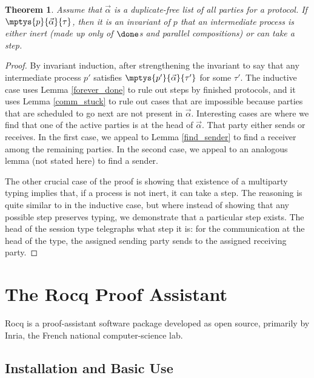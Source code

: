 \documentclass{amsbook}
\newtheorem{theorem}{Theorem}[chapter]
\theoremstyle{definition}
\theoremstyle{remark}
\numberwithin{section}{chapter}
\numberwithin{equation}{chapter}
\begin{document}
\begin{theorem}
  Assume that $\vec{\alpha}$ is a duplicate-free list of \emph{all} parties for a protocol.
  If $\mptys{p}{\vec{\alpha}}{\tau}$, then it is an invariant of $p$ that an intermediate process is either inert (made up only of $\done$s and parallel compositions) or can take a step.
\end{theorem}
\begin{proof}
  By invariant induction, after strengthening the invariant to say that any intermediate process $p'$ satisfies $\mptys{p'}{\vec{\alpha}}{\tau'}$ for some $\tau'$.
  The inductive case uses Lemma \ref{forever_done} to rule out steps by finished protocols, and it uses Lemma \ref{comm_stuck} to rule out cases that are impossible because parties that are scheduled to go next are not present in $\vec{\alpha}$.
  Interesting cases are where we find that one of the active parties is at the head of $\vec{\alpha}$.
  That party either sends or receives.
  In the first case, we appeal to Lemma \ref{find_sender} to find a receiver among the remaining parties.
  In the second case, we appeal to an analogous lemma (not stated here) to find a sender.

  The other crucial case of the proof is showing that existence of a multiparty typing implies that, if a process is not inert, it can take a step.
  The reasoning is quite similar to in the inductive case, but where instead of showing that any possible step preserves typing, we demonstrate that a particular step exists.
  The head of the session type telegraphs what step it is: for the communication at the head of the type, the assigned sending party sends to the assigned receiving party.
\end{proof}



\appendix


\chapter{\label{coqref}The Rocq Proof Assistant}

Rocq is a proof-assistant software package developed as open source, primarily by Inria, the French national computer-science lab.

\section{Installation and Basic Use}
\end{document}
